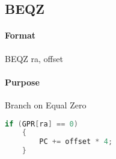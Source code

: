 \subsection{BEQZ}


\paragraph{Format} BEQZ ra, offset

\paragraph{Purpose} Branch on Equal Zero

\begin{lstlisting}[language=c]
    if (GPR[ra] == 0)
    {
        PC += offset * 4;
    }
\end{lstlisting}
